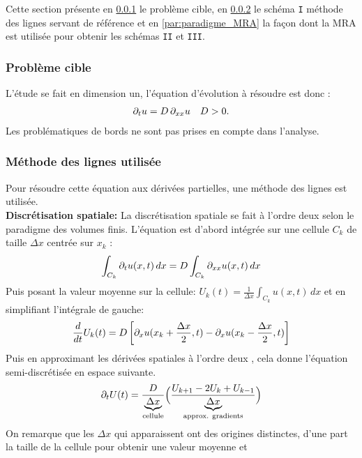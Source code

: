 Cette section présente en \ref{par:contrib2_target} le problème cible, en \ref{par:contrib2_MoL} le schéma \texttt{I} méthode des lignes servant de référence et en \ref{par:paradigme_MRA} la façon dont la MRA est utilisée pour obtenir les schémas \texttt{II} et \texttt{III}.
\subsubsection{Problème cible}\label{par:contrib2_target}

    L'étude se fait en dimension un, l'équation d'évolution à résoudre est donc :
    \begin{align}
        \partial_t u = D \,\partial_{xx} u \quad D >0.
    \end{align}
    Les problématiques de bords ne sont pas prises en compte dans l'analyse.
        \subsubsection{Méthode des lignes utilisée}\label{par:contrib2_MoL}
            Pour résoudre cette équation aux dérivées partielles, une méthode des lignes est utilisée.\\
            \textbf{Discrétisation spatiale: }
            La discrétisation spatiale se fait à l'ordre deux selon le paradigme des volumes finis.
            L'équation est d'abord intégrée sur une cellule $C_k$ de taille $\Delta x$ centrée sur $x_k$ : 
            \begin{align}
                \int_{C_k} \partial_t u(x,t) \, dx = D \int_{C_k} \partial_{xx} u(x,t) \, dx 
            \end{align}
            Puis posant la valeur moyenne sur la cellule: $U_k(t) = \frac{1}{\Delta x} \int_{C_k} u(x,t) \, dx$ et en simplifiant l'intégrale de gauche:  
            \begin{align}
                \frac{d}{dt} U_k(t) = D \left[ \partial_x u(x_k + \frac{\Delta x}{2},t) - \partial_x u(x_k - \frac{\Delta x}{2},t)\right]
            \end{align}
            Puis en approximant les dérivées spatiales à l'ordre deux , cela donne l'équation semi-discrétisée en espace suivante.
            \begin{align}
                \partial_t U(t) = \frac{D}{\underbrace{\Delta x}_{\text{cellule}}} \Bigl(\frac{U_{k+1} - 2 U_{k} + U_{k-1}}{\underbrace{\Delta x}_{\text{approx. gradients}}}\Bigr)
            \end{align}
            On remarque que les $\Delta x$ qui apparaissent ont des origines distinctes, d'une part la taille de la cellule pour obtenir une valeur moyenne et 

